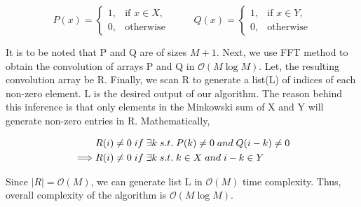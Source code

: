 \documentclass[assign]{article}
\begin{document}
\begin{equation}
   P(x) = 
     \begin{cases}
            1, & \mbox{if $x \in X$}, \\
             0, & \mbox{otherwise}
      \end{cases}
\hspace{30pt}
     Q(x) =
        \begin{cases}
            1, & \mbox{if $x \in Y$}, \\
             0, & \mbox{otherwise}
         \end{cases} 
\label{eqn1}
\end{equation} 

\noindent It is to be noted that P and Q are of sizes $M+1$. Next, we use FFT method to obtain the convolution of arrays P and Q in $\mathcal{O}(M \log M)$. Let, the resulting convolution array be R. Finally, we scan R to generate a list(L) of indices of each non-zero element.  L is the desired output of our algorithm. The reason behind this inference is that only elements in the Minkowski sum of X and Y will generate non-zero entries in R. Mathematically,

\begin{eqnarray}
  & R(i) \neq 0 \; if  \; \exists k \; s.t. \; P(k) \neq 0 \; and \; Q(i-k) \neq 0  \\ \notag
\implies & R(i) \neq 0 \; if \; \exists k \; s.t. \; k \in X \; and \; i-k \in Y \notag
\end{eqnarray} 

\noindent Since $\left | R \right| = \mathcal{O}(M)$, we can generate list L in $\mathcal{O}(M)$ time complexity. Thus, overall complexity of the algorithm is $\mathcal{O}(M \log M)$.
\end{document}
